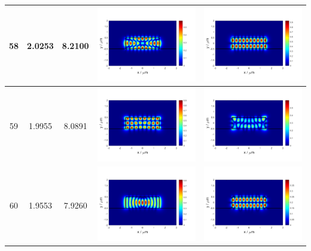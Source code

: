 \documentclass{assignment}
\begin{document}
\begin{sol}
\begin{itemize}
\begin{longtable}[c]{|c|c|c|c|c|}
            58 & 2.0253 & 8.2100 & \includegraphics[width=.3\columnwidth]{Assignment-2-mode-58-Ex.png} & \includegraphics[width=.3\columnwidth]{Assignment-2-mode-58-Ey.png} \\ \hline
            59 & 1.9955 & 8.0891 & \includegraphics[width=.3\columnwidth]{Assignment-2-mode-59-Ex.png} & \includegraphics[width=.3\columnwidth]{Assignment-2-mode-59-Ey.png} \\ \hline
            60 & 1.9553 & 7.9260 & \includegraphics[width=.3\columnwidth]{Assignment-2-mode-60-Ex.png} & \includegraphics[width=.3\columnwidth]{Assignment-2-mode-60-Ey.png} \\ \hline

\end{longtable}
\end{itemize}
\end{sol}
\end{document}
